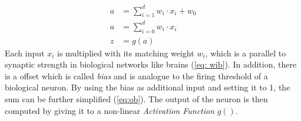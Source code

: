 \begin{align}
	a &= \sum_{i=1}^{d} w_i \cdot x_i + w_0 \label{eq: wib}\\
	a &= \sum_{i=0}^{d} w_i \cdot x_i \label{eq:ob}\\
	z &= g(a) \label{active}
\end{align}
\newline
Each input $x_i$ is multiplied with its matching weight $w_i$, which is a parallel to synaptic strength in biological networks like brains (\cref{eq: wib}). In addition, there is a offset which is called \emph{bias} and is analogue to the firing threshold of a biological neuron. By using the bias as additional input and setting it to 1, the sum can be further simplified (\cref{eq:ob}). The output of the neuron is then computed by giving it to a non-linear \emph{Activation Function} $g()$.

\newpage

